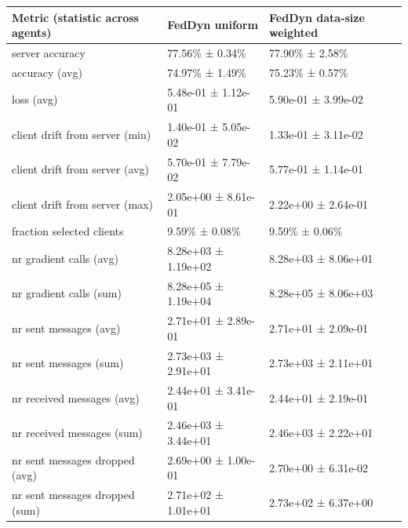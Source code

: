 \begin{tabular}{lll}
\hline
 Metric (statistic across agents)   & FedDyn uniform      & FedDyn data-size weighted   \\
\hline
 server accuracy                    & 77.56\% ± 0.34\%      & 77.90\% ± 2.58\%              \\
 accuracy (avg)                     & 74.97\% ± 1.49\%      & 75.23\% ± 0.57\%              \\
 loss (avg)                         & 5.48e-01 ± 1.12e-01 & 5.90e-01 ± 3.99e-02         \\
 client drift from server (min)     & 1.40e-01 ± 5.05e-02 & 1.33e-01 ± 3.11e-02         \\
 client drift from server (avg)     & 5.70e-01 ± 7.79e-02 & 5.77e-01 ± 1.14e-01         \\
 client drift from server (max)     & 2.05e+00 ± 8.61e-01 & 2.22e+00 ± 2.64e-01         \\
 fraction selected clients          & 9.59\% ± 0.08\%       & 9.59\% ± 0.06\%               \\
 nr gradient calls (avg)            & 8.28e+03 ± 1.19e+02 & 8.28e+03 ± 8.06e+01         \\
 nr gradient calls (sum)            & 8.28e+05 ± 1.19e+04 & 8.28e+05 ± 8.06e+03         \\
 nr sent messages (avg)             & 2.71e+01 ± 2.89e-01 & 2.71e+01 ± 2.09e-01         \\
 nr sent messages (sum)             & 2.73e+03 ± 2.91e+01 & 2.73e+03 ± 2.11e+01         \\
 nr received messages (avg)         & 2.44e+01 ± 3.41e-01 & 2.44e+01 ± 2.19e-01         \\
 nr received messages (sum)         & 2.46e+03 ± 3.44e+01 & 2.46e+03 ± 2.22e+01         \\
 nr sent messages dropped (avg)     & 2.69e+00 ± 1.00e-01 & 2.70e+00 ± 6.31e-02         \\
 nr sent messages dropped (sum)     & 2.71e+02 ± 1.01e+01 & 2.73e+02 ± 6.37e+00         \\
\hline
\end{tabular}